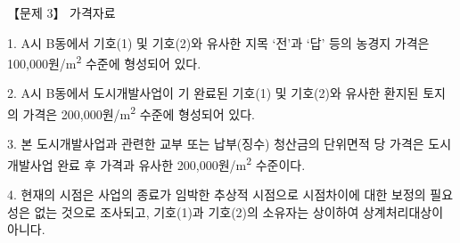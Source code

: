 \begin{longquestion}{【문제 3】}
\medskip{} 가격자료 \par
1. A시 B동에서 기호(1) 및 기호(2)와 유사한 지목 ‘전’과 ‘답’ 등의 농경지 가격은 100,000원/m\textsuperscript{2} 수준에 형성되어 있다. \par
2. A시 B동에서 도시개발사업이 기 완료된 기호(1) 및 기호(2)와 유사한 환지된 토지의 가격은 200,000원/m\textsuperscript{2} 수준에 형성되어 있다. \par
3. 본 도시개발사업과 관련한 교부 또는 납부(징수) 청산금의 단위면적 당 가격은 도시개발사업 완료 후 가격과 유사한 200,000원/m\textsuperscript{2} 수준이다. \par
4. 현재의 시점은 사업의 종료가 임박한 추상적 시점으로 시점차이에 대한 보정의 필요성은 없는 것으로 조사되고, 기호(1)과 기호(2)의 소유자는 상이하여 상계처리대상이 아니다. \par
\end{longquestion}
